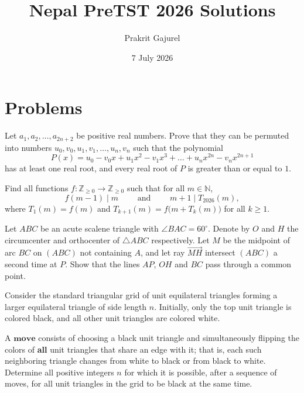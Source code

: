 \documentclass[11pt]{scrartcl}
\begin{document}
\title{Nepal PreTST 2026 Solutions}
\author{Prakrit Gajurel}
\date{7 July 2026}
\maketitle

\section{Problems}

\begin{problem}
    Let $a_1,a_2,\dots,a_{2n+2}$ be positive real numbers. Prove that they can be permuted into numbers $u_0,v_0,u_1,v_1,\dots,u_n,v_n$ such that 
    the polynomial
    $$P(x)=u_0-v_0x+u_1x^2-v_1x^3+\dots+u_nx^{2n}-v_nx^{2n+1}$$
    has at least one real root, and every real root of $P$ is greater than or equal to $1$.
\end{problem}

\begin{problem}
    Find all functions $f:\mathbb{Z}_{\ge 0}\to\mathbb{Z}_{\ge 0}$ such that for all 
    $m\in\mathbb{N}$,$$f(m-1)\mid m \qquad \text{ and } \qquad m+1 \mid T_{2026}(m),
    $$where $T_1(m)=f(m)$ and $T_{k+1}(m)=f\bigl(m+T_k(m)\bigr)$ for all $k\ge 1$.
\end{problem}

\begin{problem}
    Let $ABC$ be an acute scalene triangle with $\angle BAC=60^\circ$. Denote by $O$ and $H$ the circumcenter and orthocenter of
    $\triangle ABC$ respectively. Let $M$ be the midpoint of arc $BC$ on $(ABC)$ not containing $A$, and let ray $\overrightarrow{MH}$
    intersect $(ABC)$ a second time at $P$. Show that the lines $AP$, $OH$ and $BC$ pass through a common point.
\end{problem}

\begin{problem}
    Consider the standard triangular grid of unit equilateral triangles forming a larger equilateral triangle of side length $n$. Initially,
     only the top unit triangle is colored black, and all other unit triangles are colored white.

    A $\textbf{move}$ consists of choosing a black unit triangle and simultaneously flipping the colors of \textbf{all} unit triangles that share 
    an edge with it; that is, each such neighboring triangle changes from white to black or from black to white. Determine all positive integers
    $n$ for which it is possible, after a sequence of moves, for all unit triangles in the grid to be black at the same time.
\end{problem}
\end{document}
